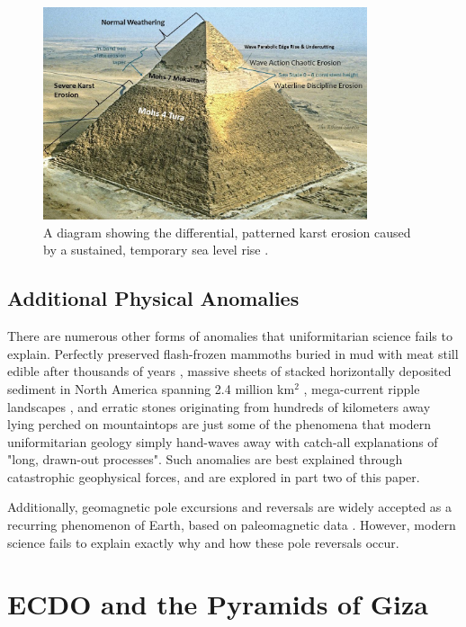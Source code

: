 \documentclass[10pt,twocolumn,letterpaper]{article}
\begin{document}
\begin{figure}[t]
\begin{center}
\includegraphics[width=0.85\textwidth]{khafre.jpg}
\end{center}
   \caption{A diagram showing the differential, patterned karst erosion caused by a sustained, temporary sea level rise \cite{27}.}
\label{fig:4}
\end{figure}

\subsection{Additional Physical Anomalies}

There are numerous other forms of anomalies that uniformitarian science fails to explain. Perfectly preserved flash-frozen mammoths buried in mud with meat still edible after thousands of years \cite{17,18,19}, massive sheets of stacked horizontally deposited sediment in North America spanning 2.4 million km$^2$ \cite{21}, mega-current ripple landscapes \cite{22}, and erratic stones originating from hundreds of kilometers away lying perched on mountaintops \cite{23,26} are just some of the phenomena that modern uniformitarian geology simply hand-waves away with catch-all explanations of "long, drawn-out processes". Such anomalies are best explained through catastrophic geophysical forces, and are explored in part two of this paper.

Additionally, geomagnetic pole excursions and reversals are widely accepted as a recurring phenomenon of Earth, based on paleomagnetic data \cite{35,40,41}. However, modern science fails to explain exactly why and how these pole reversals occur.

\section{ECDO and the Pyramids of Giza}
\end{document}
